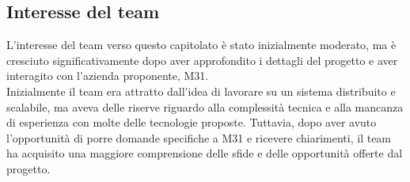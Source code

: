 \documentclass[a4paper,11pt]{article}
\begin{document}
\subsection{Interesse del team}
\parbox[t]{\linewidth}{%
L'interesse del team verso questo capitolato è stato inizialmente moderato, ma è cresciuto significativamente dopo aver approfondito i dettagli del progetto e aver interagito con l'azienda proponente, M31. \\
Inizialmente il team era attratto dall'idea di lavorare su un sistema distribuito e scalabile, ma aveva delle riserve riguardo alla complessità tecnica e alla mancanza di esperienza con molte delle tecnologie proposte. Tuttavia, dopo aver avuto l'opportunità di porre domande specifiche a M31 e ricevere chiarimenti, il team ha acquisito una maggiore comprensione delle sfide e delle opportunità offerte dal progetto. \\
}
\end{document}
